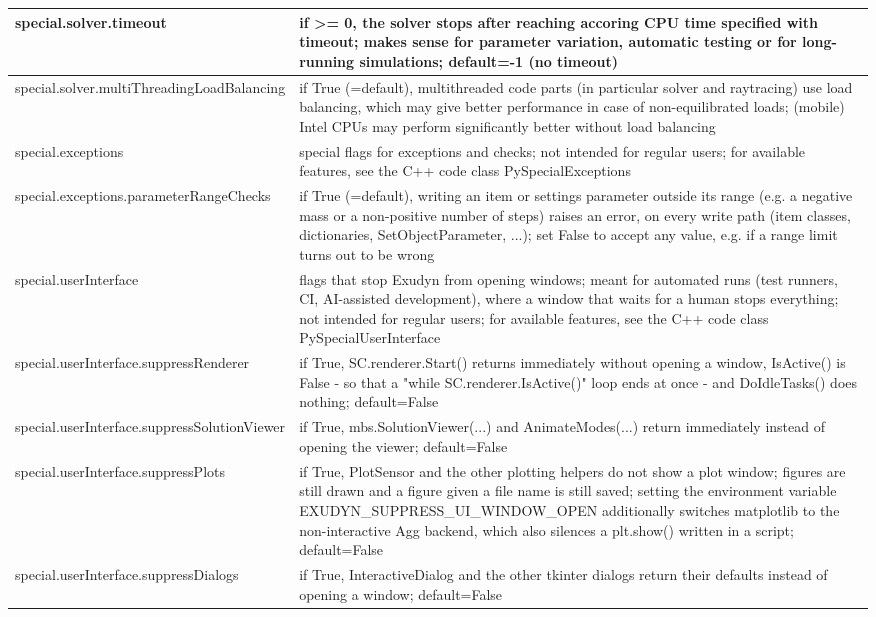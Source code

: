 \begin{center}
\begin{longtable}{| p{8cm} | p{8cm} |}
  special.solver.timeout & if >= 0, the solver stops after reaching accoring CPU time specified with timeout; makes sense for parameter variation, automatic testing or for long-running simulations; default=-1 (no timeout)\\ \hline  
  special.solver.multiThreadingLoadBalancing & if True (=default), multithreaded code parts (in particular solver and raytracing) use load balancing, which may give better performance in case of non-equilibrated loads; (mobile) Intel CPUs may perform significantly better without load balancing\\ \hline  
  special.exceptions & special flags for exceptions and checks; not intended for regular users; for available features, see the C++ code class PySpecialExceptions\\ \hline  
  special.exceptions.parameterRangeChecks & if True (=default), writing an item or settings parameter outside its range (e.g. a negative mass or a non-positive number of steps) raises an error, on every write path (item classes, dictionaries, SetObjectParameter, ...); set False to accept any value, e.g. if a range limit turns out to be wrong\\ \hline  
  special.userInterface & flags that stop Exudyn from opening windows; meant for automated runs (test runners, CI, AI-assisted development), where a window that waits for a human stops everything; not intended for regular users; for available features, see the C++ code class PySpecialUserInterface\\ \hline  
  special.userInterface.suppressRenderer & if True, SC.renderer.Start() returns immediately without opening a window, IsActive() is False - so that a "while SC.renderer.IsActive()" loop ends at once - and DoIdleTasks() does nothing; default=False\\ \hline  
  special.userInterface.suppressSolutionViewer & if True, mbs.SolutionViewer(...) and AnimateModes(...) return immediately instead of opening the viewer; default=False\\ \hline  
  special.userInterface.suppressPlots & if True, PlotSensor and the other plotting helpers do not show a plot window; figures are still drawn and a figure given a file name is still saved; setting the environment variable EXUDYN\_SUPPRESS\_UI\_WINDOW\_OPEN additionally switches matplotlib to the non-interactive Agg backend, which also silences a plt.show() written in a script; default=False\\ \hline  
  special.userInterface.suppressDialogs & if True, InteractiveDialog and the other tkinter dialogs return their defaults instead of opening a window; default=False\\ \hline  

\end{longtable}
\end{center}
